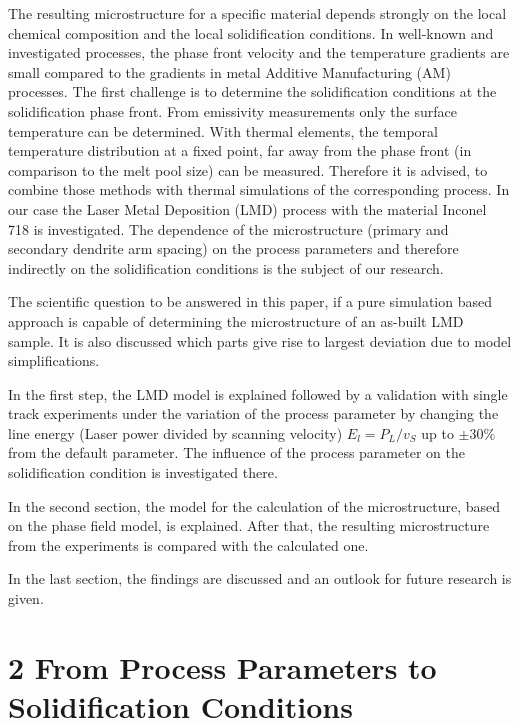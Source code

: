 \documentclass[10pt]{article}
\begin{document}
The resulting microstructure for a specific material depends strongly on the local chemical composition and the local solidification conditions. In well-known and investigated processes, the phase front velocity and the temperature gradients are small compared to the gradients in metal Additive Manufacturing (AM) processes. The first challenge is to determine the solidification conditions at the solidification phase front. From emissivity measurements only the surface temperature can be determined. With thermal elements, the temporal temperature distribution at a fixed point, far away from the phase front (in comparison to the melt pool size) can be measured. Therefore it is advised, to combine those methods with thermal simulations of the corresponding process. In our case the Laser Metal Deposition (LMD) process with the material Inconel 718 is investigated. The dependence of the microstructure (primary and secondary dendrite arm spacing) on the process parameters and therefore indirectly on the solidification conditions is the subject of our research.

The scientific question to be answered in this paper, if a pure simulation based approach is capable of determining the microstructure of an as-built LMD sample. It is also discussed which parts give rise to largest deviation due to model simplifications.

In the first step, the LMD model is explained followed by a validation with single track experiments under the variation of the process parameter by changing the line energy (Laser power divided by scanning velocity) $E_{l}=P_{L} / v_{S}$ up to $\pm 30 \%$ from the default parameter. The influence of the process parameter on the solidification condition is investigated there.

In the second section, the model for the calculation of the microstructure, based on the phase field model, is explained. After that, the resulting microstructure from the experiments is compared with the calculated one.

In the last section, the findings are discussed and an outlook for future research is given.

\section*{2 From Process Parameters to Solidification Conditions}
\end{document}
